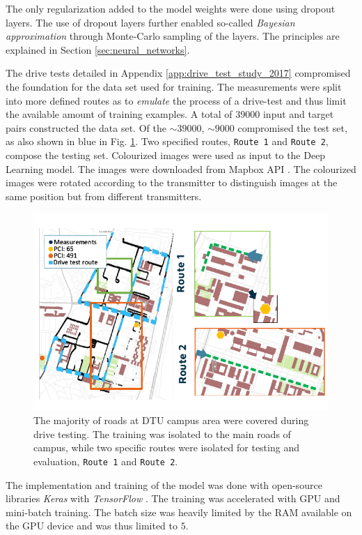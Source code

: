 The only regularization added to the model weights were done using dropout layers. The use of dropout layers further enabled so-called \emph{Bayesian approximation} through Monte-Carlo sampling of the layers. The principles are explained in Section \ref{sec:neural_networks}. 

The drive tests detailed in Appendix \ref{app:drive_test_study_2017} compromised the foundation for the data set used for training. The measurements were split into more defined routes as to \emph{emulate} the process of a drive-test and thus limit the available amount of training examples. A total of $39000$ input and target pairs constructed the data set. Of the $\sim 39000$, $\sim 9000$ compromised the test set, as also shown in blue in Fig. \ref{fig:drive_test_routes_split}. Two specified routes, \texttt{Route 1} and \texttt{Route 2}, compose the testing set. Colourized images were used as input to the Deep Learning model. The images were downloaded from Mapbox API \cite{MapboxWebsite}. The colourized images were rotated according to the transmitter to distinguish images at the same position but from different transmitters.

\begin{figure}
    \centering
    \includegraphics{chapters/part_pathloss/drive_test_minimzation_paper/route_drawing.pdf}
    \caption{The majority of roads at DTU campus area were covered during drive testing. The training was isolated to the main roads of campus, while two specific routes were isolated for testing and evaluation, \texttt{Route 1} and \texttt{Route 2}.}
    \label{fig:drive_test_routes_split}
\end{figure}

The implementation and training of the model was done with open-source libraries \emph{Keras} \cite{chollet2015keras} with \emph{TensorFlow} \cite{tensorflow2015-whitepaper}. The training was accelerated with GPU and mini-batch training. The batch size was heavily limited by the RAM available on the GPU device and was thus limited to $5$. 


